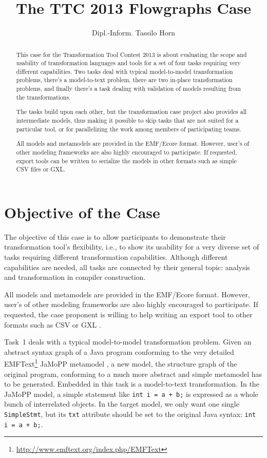 \documentclass[submission,copyright,creativecommons]{eptcs}
\title{The TTC 2013 Flowgraphs Case}
\author{Dipl.-Inform. Tassilo Horn
  \email{\myemail}
  \institute{University Koblenz-Landau, Campus Koblenz\\
    Institute for Software Technology\\
    Universitätsstraße 1, 56070 Koblenz, Germany}}
\begin{document}
\maketitle

\begin{abstract}
  This case for the Transformation Tool Contest 2013 is about evaluating the
  scope and usability of transformation languages and tools for a set of four
  tasks requiring very different capabilities.  Two tasks deal with typical
  model-to-model transformation problems, there's a model-to-text problem,
  there are two in-place transformation problems, and finally there's a task
  dealing with validation of models resulting from the transformations.

  The tasks build upon each other, but the transformation case project also
  provides all intermediate models, thus making it possible to skip tasks that
  are not suited for a particular tool, or for parallelizing the work among
  members of participating teams.

  All models and metamodels are provided in the EMF/Ecore format.  However,
  user's of other modeling frameworks are also highly encouraged to
  participate.  If requested, export tools can be written to serialize the
  models in other formats such as simple CSV files or GXL.
\end{abstract}

\sloppy

\section{Objective of the Case}
\label{sec:objective}

The objective of this case is to allow participants to demonstrate their
transformation tool's flexibility, i.e., to show its usability for a very
diverse set of tasks requiring different transformation capabilities.  Although
different capabilities are needed, all tasks are connected by their general
topic: analysis and transformation in compiler construction.

All models and metamodels are provided in the EMF/Ecore format.  However,
user's of other modeling frameworks are also highly encouraged to participate.
If requested, the case proponent is willing to help writing an export tool to
other formats such as CSV or GXL \cite{GXL02}.

Task~1 deals with a typical model-to-model transformation problem.  Given an
abstract syntax graph of a Java program conforming to the very detailed
EMFText\footnote{\url{http://www.emftext.org/index.php/EMFText}} JaMoPP
metamodel \cite{jamopp09}, a new model, the structure graph of the original
program, conforming to a much more abstract and simple metamodel has to be
generated.  Embedded in this task is a model-to-text transformation.  In the
JaMoPP model, a simple statement like \verb|int i = a + b;| is expressed as a
whole bunch of interrelated objects.  In the target model, we only want one
single \verb|SimpleStmt|, but its \verb|txt| attribute should be set to the
original Java syntax: \verb|int i = a + b;|.
\end{document}
